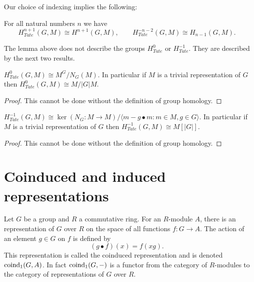 Our choice of indexing implies the following:

\begin{lemma}
	\label{lem:Tate cohomology is cohomology or homology}
	\leanok
	For all natural numbers $n$ we have
	\[
		H^{n+1}_{Tate}(G,M) \cong H^{n+1} (G,M), \qquad
		H^{-n-2}_{Tate}(G,M) \cong H_{n-1} (G,M).
	\]
\end{lemma}

The lemma above does not describe the groups $H^0_{Tate}$ or $H^{-1}_{Tate}$.
They are described by the next two results.

\begin{lemma}
	\label{lem:Tate 0}
	\leanok
	$H^0_{Tate}(G,M) \cong M^G / N_G(M)$.
	In particular if $M$ is a trivial representation of $G$ then
	$H^0_{Tate}(G,M) \cong M / |G|M$.
\end{lemma}

\begin{proof}
	This cannot be done without the definition of group homology.
\end{proof}

\begin{lemma}
	\label{lem:Tate -1}
	\leanok
	$H^{-1}_{Tate}(G,M) \cong \ker (N_G : M \to M ) /
	\langle {m - g \bullet m : m \in M, g \in G}\rangle$.
	In particular if $M$ is a trivial representation of $G$ then
	$H^{-1}_{Tate}(G,M) \cong M[|G|]$.
\end{lemma}

\begin{proof}
	This cannot be done without the definition of group homology.
\end{proof}



\section{Coinduced and induced representations}

\begin{definition}
	\label{def:coind₁}
	\leanok
	Let $G$ be a group and $R$ a commutative ring.
	For an $R$-module $A$, there is an representation of $G$ over $R$
	on the space of all functions $f : G \to A$. The action of an element $g \in G$ on $f$
	is defined by
	\[
		(g \bullet f) (x) = f(xg).
	\]
	This representation is called the coinduced representation and is denoted $\mathrm{coind}_1(G,A)$.
	In fact $\mathrm{coind}_1(G,-)$ is a functor from the category of $R$-modules to the category of
	representations
	of $G$ over $R$.
\end{definition}

